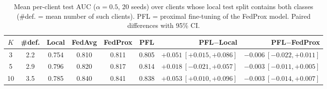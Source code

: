 \begin{table}[t]
\caption{Mean per-client test AUC ($\alpha=0.5$, 20 seeds) over clients whose local test split contains both classes (\#def. = mean number of such clients). PFL = proximal fine-tuning of the FedProx model. Paired differences with 95\% CI.}
\centering\small
\begin{tabular}{ccccccrr}
\toprule
$K$ & \#def. & Local & FedAvg & FedProx & PFL & PFL$-$Local & PFL$-$FedProx \\
\midrule
3 & 2.2 & 0.754 & 0.810 & 0.811 & 0.805 & $+0.051\ [+0.015, +0.086]$ & $-0.006\ [\ensuremath{-}0.022, +0.011]$ \\
5 & 2.9 & 0.796 & 0.820 & 0.817 & 0.814 & $+0.018\ [\ensuremath{-}0.021, +0.057]$ & $-0.003\ [\ensuremath{-}0.011, +0.005]$ \\
10 & 3.5 & 0.785 & 0.840 & 0.841 & 0.838 & $+0.053\ [+0.010, +0.096]$ & $-0.003\ [\ensuremath{-}0.014, +0.007]$ \\
\bottomrule
\end{tabular}
\label{tab:local_adaptation}
\end{table}
